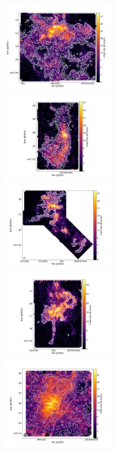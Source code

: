 \documentclass[traditabstract]{aa}
\begin{document}

\begin{figure}[h]
  \centering
  \includegraphics[height=4.5cm,trim=50 40 50 40,clip=true]{Figures/Draco1_stack.png}
  \hspace{3mm}
  \includegraphics[height=4.5cm,trim=50 40 50 40,clip=true]{Figures/Draco4_stack.png} \\
  \includegraphics[height=4.5cm,trim=50 40 50 40,clip=true]{Figures/Draco2+9_stack.png}
  \hspace{3mm}
  \includegraphics[height=4.5cm,trim=50 40 50 40,clip=true]{Figures/Draco5_stack.png} \\
  \includegraphics[height=4.5cm,trim=50 40 50 40,clip=true]{Figures/Draco3_stack.png}

\end{figure}
\end{document}
